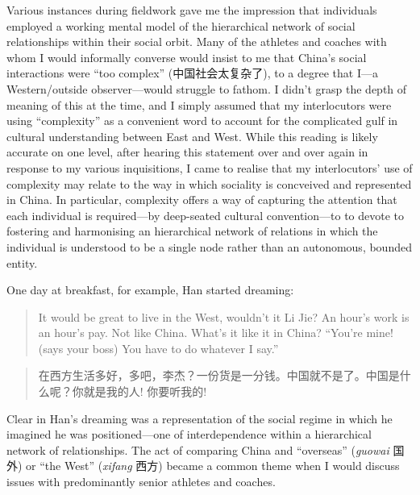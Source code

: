 \begin{CJK}{UTF8}{gbsn}

Various instances during fieldwork gave me the impression that individuals employed a working mental model of the hierarchical network of social relationships within their social orbit.  Many of the athletes and coaches with whom I would informally converse would insist to me that China's social interactions were ``too complex'' (中国社会太复杂了), to a degree that I---a Western/outside observer---would struggle to fathom. I didn't grasp the depth of meaning of this at the time, and I simply assumed that my interlocutors were using ``complexity'' as a convenient word to account for the complicated gulf in cultural understanding between East and West.  While this reading is likely accurate on one level, after hearing this statement over and over again in response to my various inquisitions, I came to realise that my interlocutors' use of complexity may relate to the way in which sociality is concveived and represented in China.  In particular, complexity offers a way of capturing the attention that each individual is required---by deep-seated cultural convention---to to devote to fostering and harmonising an hierarchical network of relations in which the individual is understood to be a single node rather than an autonomous, bounded entity.

One day at breakfast, for example, Han started dreaming:

\begin{quotation}
  It would be great to live in the West, wouldn’t it Li Jie?  An hour’s work is an hour’s pay.  Not like China.  What’s it like it in China? ``You’re mine! (says your boss) You have to do whatever I say.''
\end{quotation}

\begin{quotation}
  在西方生活多好，多吧，李杰？一份货是一分钱。中国就不是了。中国是什么呢？你就是我的人! 你要听我的!
\end{quotation}

Clear in Han's dreaming was a representation of the social regime in which he imagined he was positioned---one of interdependence within a hierarchical network of relationships.  The act of comparing China and ``overseas'' (\textit{guowai} 国外) or ``the West'' (\textit{xifang} 西方) became a common theme when I would discuss issues with predominantly senior athletes and coaches.


\end{CJK}
